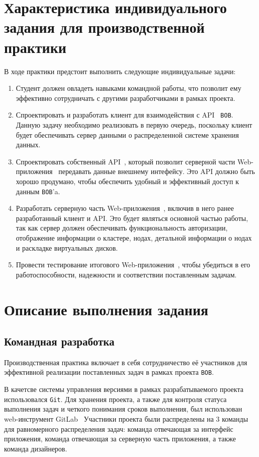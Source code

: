 \clearpage

\section{Характеристика индивидуального задания для производственной практики}

В ходе практики предстоит выполнить следующие индивидуальные задачи:
\begin{enumerate}[label={\arabic*.}]
  \item Студент должен овладеть навыками командной работы, что позволит ему эффективно сотрудничать с другими разработчиками в рамках проекта.
  \item Спроектировать и разработать клиент для взаимодействия с API~\cite{api} \texttt{BOB}. Данную задачу необходимо реализовать в первую очередь, поскольку клиент будет обеспечивать сервер данными о распределенной системе хранения данных.
  \item Спроектировать собственный API~\cite{api}, который позволит серверной части Web-приложения~\cite{web} передавать данные внешнему интефейсу. Это API должно быть хорошо продумано, чтобы обеспечить удобный и эффективный доступ к данным \texttt{BOB}'a.
  \item Разработать серверную часть Web-приложения~\cite{web}, включив в него ранее разработанный клиент и API. Это будет являться основной частью работы, так как сервер должен обеспечивать функциональность авторизации, отображение информации о кластере, нодах, детальной информации о нодах и раскладке виртуальных дисков.
  \item Провести тестирование итогового Web-приложения~\cite{web}, чтобы убедиться в его работоспособности, надежности и соответствии поставленным задачам. 
\end{enumerate}

\section{Описание выполнения задания}

\subsection{Командная разработка}

Производственная практика включает в себя сотрудничество её участников для эффективной реализации поставленных задач в рамках проекта \texttt{BOB}.

В качетсве системы управления версиями в рамках разрабатываемого проекта использовался \texttt{Git}.
Для хранения проекта, а также для контроля статуса выполнения задач и четкого понимания сроков выполнения, был использован web-инструмент GitLab~\cite{cowell2023automating}
Участники проекта были распределены на 3 команды для равномерного распределения задач: команда отвечающая за интерфейс приложения, команда отвечающая за серверную часть приложения, а также команда дизайнеров.

